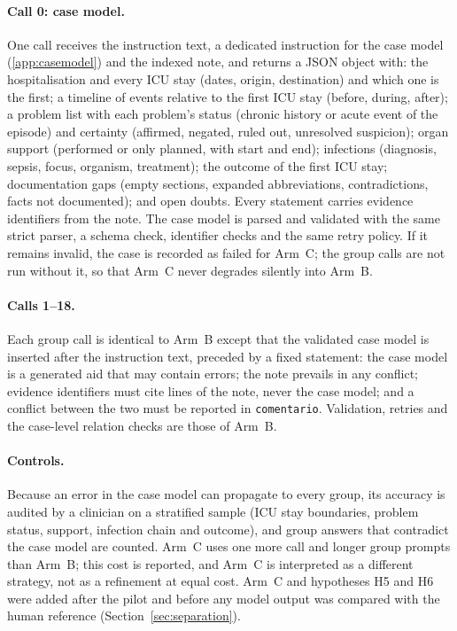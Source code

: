 \paragraph{Call 0: case model.} One call receives the instruction text, a dedicated instruction for the
case model (\ref{app:casemodel}) and the indexed note, and returns a JSON object with: the hospitalisation
and every ICU stay (dates, origin, destination) and which one is the first; a timeline of events relative
to the first ICU stay (before, during, after); a problem list with each problem's status (chronic
history or acute event of the episode) and certainty (affirmed, negated, ruled out, unresolved suspicion);
organ support (performed or only planned, with start and end); infections (diagnosis, sepsis, focus,
organism, treatment); the outcome of the first ICU stay; documentation gaps (empty sections, expanded
abbreviations, contradictions, facts not documented); and open doubts. Every statement carries evidence
identifiers from the note. The case model is parsed and validated with the same strict parser, a schema
check, identifier checks and the same retry policy. If it remains invalid, the case is recorded as failed
for Arm~C; the group calls are not run without it, so that Arm~C never degrades silently into Arm~B.

\paragraph{Calls 1--18.} Each group call is identical to Arm~B except that the validated case model is
inserted after the instruction text, preceded by a fixed statement: the case model is a generated aid that
may contain errors; the note prevails in any conflict; evidence identifiers must cite lines of the note,
never the case model; and a conflict between the two must be reported in \texttt{comentario}. Validation,
retries and the case-level relation checks are those of Arm~B.

\paragraph{Controls.} Because an error in the case model can propagate to every group, its accuracy is
audited by a clinician on a stratified sample (ICU stay boundaries, problem status, support, infection
chain and outcome), and group answers that contradict the case model are counted. Arm~C uses one more call
and longer group prompts than Arm~B; this cost is reported, and Arm~C is interpreted as a different strategy,
not as a refinement at equal cost. Arm~C and hypotheses H5 and H6 were added after the pilot and before any
model output was compared with the human reference (Section~\ref{sec:separation}).

